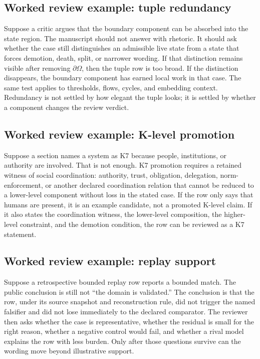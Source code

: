 \subsection{Worked review example: tuple redundancy}

Suppose a critic argues that the boundary component can be absorbed into the
state region. The manuscript should not answer with rhetoric. It should ask
whether the case still distinguishes an admissible live state from a state that
forces demotion, death, split, or narrower wording. If that distinction remains
visible after removing \(\partial\Omega\), then the tuple row is too broad. If
the distinction disappears, the boundary component has earned local work in
that case. The same test applies to thresholds, flows, cycles, and embedding
context. Redundancy is not settled by how elegant the tuple looks; it is settled
by whether a component changes the review verdict.

\subsection{Worked review example: K-level promotion}

Suppose a section names a system as K7 because people, institutions, or
authority are involved. That is not enough. K7 promotion requires a retained
witness of social coordination: authority, trust, obligation, delegation,
norm-enforcement, or another declared coordination relation that cannot be
reduced to a lower-level component without loss in the stated case. If the row
only says that humans are present, it is an example candidate, not a promoted
K-level claim. If it also states the coordination witness, the lower-level
composition, the higher-level constraint, and the demotion condition, the row
can be reviewed as a K7 statement.

\subsection{Worked review example: replay support}

Suppose a retrospective bounded replay row reports a bounded match. The public conclusion
is still not ``the domain is validated.'' The conclusion is that the row, under
its source snapshot and reconstruction rule, did not trigger the named
falsifier and did not lose immediately to the declared comparator. The reviewer
then asks whether the case is representative, whether the residual is small for
the right reason, whether a negative control would fail, and whether a rival
model explains the row with less burden. Only after those questions survive can
the wording move beyond illustrative support.

